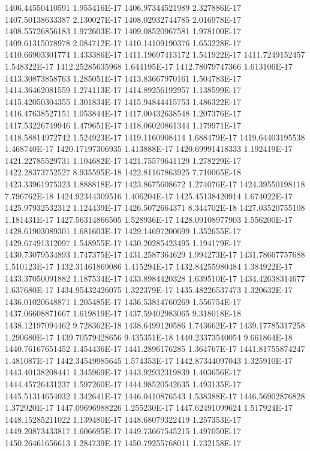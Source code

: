 1406.44550410591  1.955416E-17
1406.97344521989  2.327886E-17
1407.50138633387  2.130027E-17
1408.02932744785  2.016978E-17
1408.55726856183  1.972603E-17
1409.08520967581  1.978100E-17
1409.61315078978  2.084712E-17
1410.14109190376  1.653228E-17
1410.66903301774  1.433386E-17
1411.19697413172  1.541922E-17
1411.7249152457  1.548322E-17
1412.25285635968  1.644195E-17
1412.78079747366  1.613106E-17
1413.30873858763  1.285051E-17
1413.83667970161  1.504783E-17
1414.36462081559  1.274113E-17
1414.89256192957  1.138599E-17
1415.42050304355  1.301834E-17
1415.94844415753  1.486322E-17
1416.47638527151  1.053844E-17
1417.00432638548  1.207376E-17
1417.53226749946  1.479651E-17
1418.06020861344  1.179971E-17
1418.58814972742  1.524923E-17
1419.1160908414  1.688479E-17
1419.64403195538  1.468740E-17
1420.17197306935  1.413888E-17
1420.69991418333  1.192419E-17
1421.22785529731  1.104682E-17
1421.75579641129  1.278229E-17
1422.28373752527  8.935595E-18
1422.81167863925  7.710065E-18
1423.33961975323  1.888818E-17
1423.8675608672  1.274076E-17
1424.39550198118  7.796762E-18
1424.92344309516  1.406204E-17
1425.45138420914  1.674022E-17
1425.97932532312  1.124439E-17
1426.5072664371  8.344702E-18
1427.03520755108  1.181431E-17
1427.56314866505  1.528936E-17
1428.09108977903  1.556200E-17
1428.61903089301  1.681603E-17
1429.14697200699  1.352655E-17
1429.67491312097  1.548955E-17
1430.20285423495  1.194179E-17
1430.73079534893  1.747375E-17
1431.2587364629  1.994273E-17
1431.78667757688  1.510123E-17
1432.31461869086  1.415294E-17
1432.84255980484  1.384922E-17
1433.37050091882  1.187534E-17
1433.8984420328  1.639510E-17
1434.42638314677  1.637680E-17
1434.95432426075  1.322379E-17
1435.48226537473  1.320632E-17
1436.01020648871  1.205485E-17
1436.53814760269  1.556754E-17
1437.06608871667  1.619819E-17
1437.59402983065  9.318018E-18
1438.12197094462  9.728362E-18
1438.6499120586  1.743662E-17
1439.17785317258  1.290680E-17
1439.70579428656  9.435351E-18
1440.23373540054  9.661864E-18
1440.76167651452  1.454436E-17
1441.2896176285  1.364767E-17
1441.81755874247  1.481087E-17
1442.34549985645  1.574353E-17
1442.87344097043  1.325910E-17
1443.40138208441  1.345969E-17
1443.92932319839  1.403656E-17
1444.45726431237  1.597260E-17
1444.98520542635  1.493135E-17
1445.51314654032  1.342641E-17
1446.0410876543  1.538388E-17
1446.56902876828  1.372920E-17
1447.09696988226  1.255230E-17
1447.62491099624  1.517924E-17
1448.15285211022  1.139480E-17
1448.68079322419  1.257353E-17
1449.20873433817  1.606695E-17
1449.73667545215  1.497050E-17
1450.26461656613  1.284739E-17
1450.79255768011  1.732158E-17
